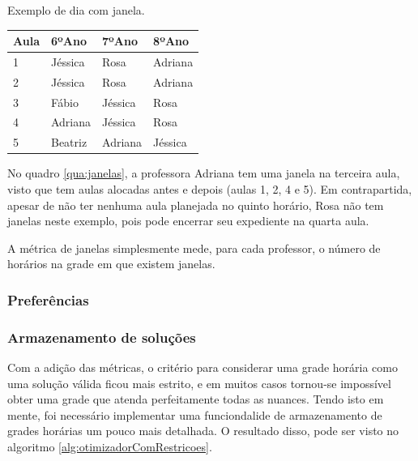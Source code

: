 \begin{quadro}[!htb]
	\centering
	\caption{Exemplo de dia com janela.\label{qua:janelas}}
	\begin{tabular}{|p{3cm}|p{3cm}|p{3cm}|p{3cm}|}
		\hline
		\textbf{Aula} & \textbf{6ºAno} & \textbf{7ºAno} & \textbf{8ºAno} \\
		\hline
		1 & Jéssica & Rosa & Adriana \\
		\hline
		2 & Jéssica & Rosa & Adriana \\
		\hline
		3 & Fábio & Jéssica & Rosa \\
		\hline
		4 & Adriana & Jéssica & Rosa \\
		\hline
		5 & Beatriz & Adriana & Jéssica \\
		\hline
	\end{tabular}
\end{quadro}

No quadro \ref{qua:janelas}, a professora Adriana tem uma janela na terceira aula, visto que tem aulas alocadas antes e depois (aulas 1, 2, 4 e 5). Em contrapartida, apesar de não ter nenhuma aula planejada no quinto horário, Rosa não tem janelas neste exemplo, pois pode encerrar seu expediente na quarta aula.

A métrica de janelas simplesmente mede, para cada professor, o número de horários na grade em que existem janelas.

\subsubsection{Preferências}

\subsubsection{Armazenamento de soluções}
\label{subsec:salvamento}

Com a adição das métricas, o critério para considerar uma grade horária como uma solução válida ficou mais estrito, e em muitos casos tornou-se impossível obter uma grade que atenda perfeitamente todas as nuances. Tendo isto em mente, foi necessário implementar uma funciondalide de armazenamento de grades horárias um pouco mais detalhada. O resultado disso, pode ser visto no algoritmo \ref{alg:otimizadorComRestricoes}.

